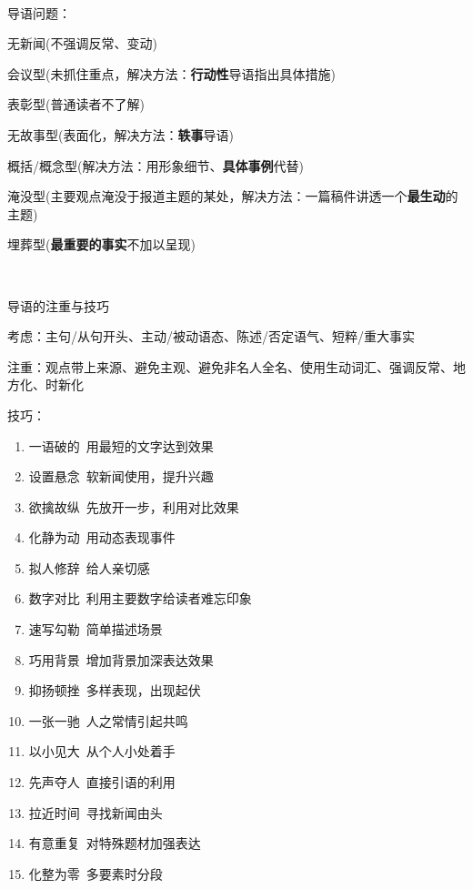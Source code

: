 \documentclass[a4paper,UTF8]{ctexart}
\begin{document}
~

导语问题：

无新闻(不强调反常、变动)

会议型(未抓住重点，解决方法：\textbf{行动性}导语指出具体措施)

表彰型(普通读者不了解)

无故事型(表面化，解决方法：\textbf{轶事}导语)

概括/概念型(解决方法：用形象细节、\textbf{具体事例}代替)

淹没型(主要观点淹没于报道主题的某处，解决方法：一篇稿件讲透一个\textbf{最生动}的主题)

埋葬型(\textbf{最重要的事实}不加以呈现)

~

导语的注重与技巧

考虑：主句/从句开头、主动/被动语态、陈述/否定语气、短粹/重大事实

注重：观点带上来源、避免主观、避免非名人全名、使用生动词汇、强调反常、地方化、时新化

技巧：

\begin{enumerate}
	\item 一语破的\ 用最短的文字达到效果
	\item 设置悬念\ 软新闻使用，提升兴趣
	\item 欲擒故纵\ 先放开一步，利用对比效果
	\item 化静为动\ 用动态表现事件
	\item 拟人修辞\ 给人亲切感
	\item 数字对比\ 利用主要数字给读者难忘印象
	\item 速写勾勒\ 简单描述场景
	\item 巧用背景\ 增加背景加深表达效果
	\item 抑扬顿挫\ 多样表现，出现起伏
	\item 一张一驰\ 人之常情引起共鸣
	\item 以小见大\ 从个人小处着手
	\item 先声夺人\ 直接引语的利用
	\item 拉近时间\ 寻找新闻由头
	\item 有意重复\ 对特殊题材加强表达
	\item 化整为零\ 多要素时分段
\end{enumerate}
\end{document}
